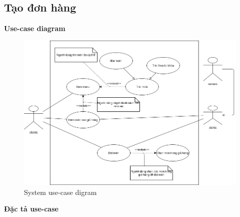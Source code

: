 \newpage
\subsection{Tạo đơn hàng}

\textbf{Use-case diagram}

\begin{figure}[!h]
    \begin{center}
        \includegraphics[scale=0.5]{Images/SE_UML-Đặt món.drawio.png}
    \end{center}
    \caption{System use-case digram}
\end{figure}

\newpage
\textbf{Đặc tả use-case}

